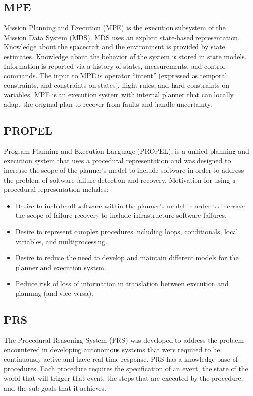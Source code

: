 \documentclass[conference]{IEEEtran}
\begin{document}
\subsection{\textbf{MPE}}\label{sec:mpe}
Mission Planning and Execution (MPE) is the execution subsystem of the Mission Data System (MDS). MDS uses an explicit state-based representation. Knowledge about the spacecraft and the environment is provided by state estimates. Knowledge about the behavior of the system is stored in state models. Information is reported via a history of states, measurements, and control commands. The input to MPE is operator “intent” (expressed as temporal constraints, and constraints on states), flight rules, and hard constraints on variables. MPE is an execution system with internal planner that can locally adapt the original plan to recover from faults and handle uncertainty.

\subsection{\textbf{PROPEL}}\label{sec:propel}
Program Planning and Execution Language (PROPEL), is a unified planning and execution system that uses a procedural representation and was designed to increase the scope of the planner’s model to include software in order to address the problem of software failure detection and recovery. Motivation for using a procedural representation includes:
\begin{itemize}
    \item Desire to include all software within the planner’s model in order to increase the scope of failure recovery to include infrastructure software failures.
    \item Desire to represent complex procedures including loops, conditionals, local variables, and multiprocessing.
    \item Desire to reduce the need to develop and maintain different models for the planner and execution system.
    \item Reduce risk of loss of information in translation between execution and planning (and vice versa).
\end{itemize}

\subsection{\textbf{PRS}}\label{sec:prs}
The Procedural Reasoning System (PRS) was developed to address the problem encountered in developing autonomous systems that were required to be continuously active and have real-time response. PRS has a knowledge-base of procedures. Each procedure requires the specification of an event, the state of the world that will trigger that event, the steps that are executed by the procedure, and the sub-goals that it achieves.
\end{document}

